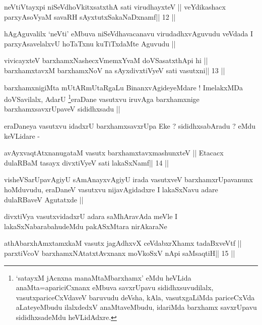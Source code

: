 \begin{shl}
neVtiVtayxpi niSeVdhoVkitxsatxthA sati virudhayxteV ||
veYdikashacx parxyAsoV\s yaM savaRH sAyxtutxSakaNaDxnamf\hfill || 12 ||
\end{shl}

\begin{artha}
hAgAguvalilx `neVti' eMbuva niSeVdhavacanavu virudadhxvAguvudu veVdada
I parxyAsavelalxvU hoTaTxnu kuTiTxdaMte Aguvudu ||
\end{artha}

\begin{shl}
vivicayxteV barxhamxNashecxVmemxYvaM doVSasatxthA\s pi hi ||
barxhamxtavxM barxhamxNoV na sAyxdivxtiVyeV sati vasutxni\hfill || 13 ||
\end{shl}

\begin{artha}
barxhamxnigiMta mUtARmUtaRgaLu BinanxvAgideyeMdare ! ImelakxMDa
doVSavilalx, AdarU \footnote[1]{`satayxM jAcnxna manaMtaMbarxhamx'
  eMdu heVLida anaMta=apariciCxnanx eMbuva savxrUpavu
  sididhxsuvudilalx, vasutxpariceCxVdaveV baruvudu deVsha, kAla,
  vasutxgaLiMda pariceCxVda aLateyeMbudu ilalxdedxV anaMtaveMbudu,
  idariMda barxhamx savxrUpavu sididhxsadeMdu heVLidAdxre.}eraDane vasutxvu iruvAga barxhamxnige
barxhamxsavxrUpaveV sididhxsadu ||
\end{artha}

\begin{artha}
eraDaneya vasutxvu idadxrU barxhamxsavxrUpa Eke ? sididhxsabAradu ?
eMdu keVLidare -
\end{artha}

\begin{shl}
avAyxvaqtAtxnanugataM vasutx barxhamxtavxmashunxteV ||
Etacacx dulaRBaM tasayx divxtiVyeV sati lakaSxNamf\hfill || 14 ||
\end{shl}

\begin{artha}
visheVSarUpavAgiyU sAmAnayxvAgiyU irada vasutxveV barxhamxrUpavanunx
hoMduvudu, eraDaneV vasutxvu nijavAgidadxre I lakaSxNavu adare
dulaRBaveV Agutatxde ||
\end{artha}

\begin{artha}
divxtiVya vasutxvidadxrU adara saMhAravAda meVle I
lakaSxNabarabahudeMdu pakASxMtara nirAkaraNe
\end{artha}

\begin{shl}
athAbarxhAmxtamxkaM vasutx jagAdhxvX ceVdabxrXhamx tadaBxveVtf ||
parxtiVcoV barxhamxNA\s tatxtAvxnanx moVkoSxV nApi saMsaqtiH\hfill || 15 ||
\end{shl}

